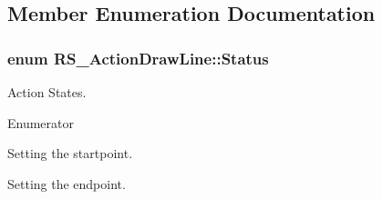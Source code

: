 \subsection{Member Enumeration Documentation}
\hypertarget{classRS__ActionDrawLine_a885462502f6f10b5d4f03bdc4e9b322b}{
\subsubsection[{Status}]{\setlength{\rightskip}{0pt plus 5cm}enum {\bf R\-S\-\_\-\-Action\-Draw\-Line\-::\-Status}}}\label{classRS__ActionDrawLine_a885462502f6f10b5d4f03bdc4e9b322b}
Action States. \begin{Desc}
\item[Enumerator]\par
\begin{description}
\item[{\em 
\hypertarget{classRS__ActionDrawLine_a885462502f6f10b5d4f03bdc4e9b322ba70f12197494457eada2be713d7ec4280}{Set\-Startpoint}\label{classRS__ActionDrawLine_a885462502f6f10b5d4f03bdc4e9b322ba70f12197494457eada2be713d7ec4280}
}]Setting the startpoint. \item[{\em 
\hypertarget{classRS__ActionDrawLine_a885462502f6f10b5d4f03bdc4e9b322baee97132168da5a379101a036748065da}{Set\-Endpoint}\label{classRS__ActionDrawLine_a885462502f6f10b5d4f03bdc4e9b322baee97132168da5a379101a036748065da}
}]Setting the endpoint. \end{description}
\end{Desc}



